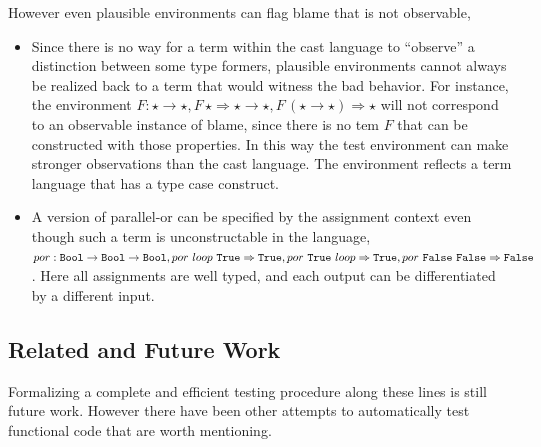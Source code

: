  However even plausible environments can flag blame that is not observable,
 \begin{itemize}
 \item
 Since there is no way for a term within the cast language to ``observe'' a distinction between some type formers, plausible environments cannot always be realized back to a term that would witness the bad behavior.
 For instance, the environment $F:\star\rightarrow\star,F\,\star \Rightarrow \star\rightarrow\star,F\,\left(\star\rightarrow\star\right) \Rightarrow \star$
  will not correspond to an observable instance of blame, since there is no tem $F$ that can be constructed with those properties.
 In this way the test environment can make stronger observations than the cast language.
 The environment reflects a term language that has a type case construct.
 \item
 A version of parallel-or can be specified by the assignment context even though such a term is unconstructable in the language, $por:\Bool{}\rightarrow\Bool{}\rightarrow\Bool{},por\ loop\ \True{} \Rightarrow  \True{}, por\ \True{} \ loop \Rightarrow \True{},por\ \False{}\ \False{} \Rightarrow  \False{}$.
 Here all assignments are well typed, and each output can be differentiated by a different input.
\end{itemize}
  
\subsection{Related and Future Work}
 
Formalizing a complete and efficient testing procedure along these lines is still future work.
However there have been other attempts to automatically test functional code that are worth mentioning.
 
